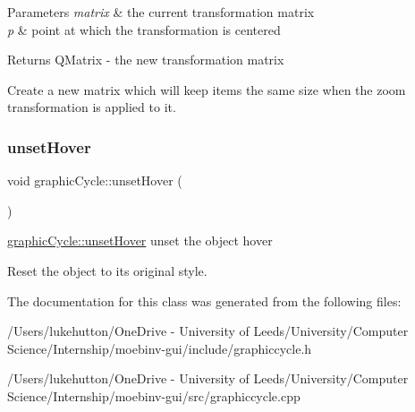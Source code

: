 \begin{DoxyParams}{Parameters}
{\em matrix} & the current transformation matrix \\
\hline
{\em p} & point at which the transformation is centered \\
\hline
\end{DoxyParams}
\begin{DoxyReturn}{Returns}
Q\+Matrix -\/ the new transformation matrix
\end{DoxyReturn}
Create a new matrix which will keep items the same size when the zoom transformation is applied to it. \mbox{\label{classgraphic_cycle_a7d9d805ccc83dcf16623c969ad48b6a5}} 
\subsubsection{\texorpdfstring{unset\+Hover}{unsetHover}}
{\footnotesize\ttfamily void graphic\+Cycle\+::unset\+Hover (\begin{DoxyParamCaption}{ }\end{DoxyParamCaption})\hspace{0.3cm}{\ttfamily [slot]}}



\mbox{\hyperlink{classgraphic_cycle_a7d9d805ccc83dcf16623c969ad48b6a5}{graphic\+Cycle\+::unset\+Hover}} unset the object hover 

Reset the object to its original style. 

The documentation for this class was generated from the following files\+:\begin{DoxyCompactItemize}
\item 
/\+Users/lukehutton/\+One\+Drive -\/ University of Leeds/\+University/\+Computer Science/\+Internship/moebinv-\/gui/include/graphiccycle.\+h\item 
/\+Users/lukehutton/\+One\+Drive -\/ University of Leeds/\+University/\+Computer Science/\+Internship/moebinv-\/gui/src/graphiccycle.\+cpp\end{DoxyCompactItemize}
